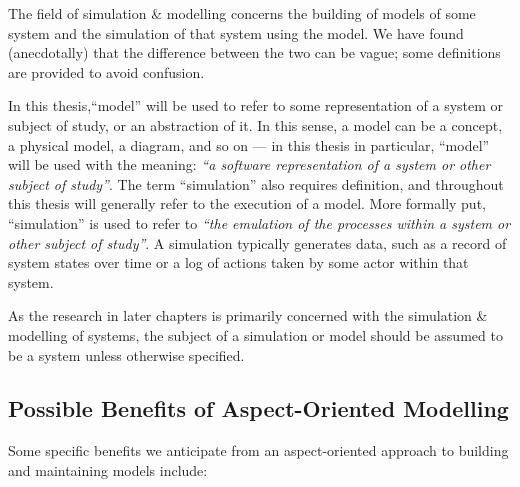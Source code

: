 The field of simulation \& modelling concerns the building of models of some
system and the simulation of that system using the model. We have found
(anecdotally) that the difference between the two can be vague; some definitions
are provided to avoid confusion.

In this thesis,``model'' will be used to refer to some representation of a
system or subject of study, or an abstraction of it. In this sense, a model can
be a concept, a physical model, a diagram, and so on --- in this thesis in
particular, ``model'' will be used with the meaning: \emph{``a software
  representation of a system or other subject of study''}. The term
``simulation'' also requires definition, and throughout this thesis will
generally refer to the execution of a model. More formally put, ``simulation''
is used to refer to \emph{``the emulation of the processes within a system or
  other subject of study''}. A simulation typically generates data, such as a
record of system states over time or a log of actions taken by some actor within
that system.

As the research in later chapters is primarily concerned with the simulation \&
modelling of \sociotechnical systems, the subject of a simulation or model
should be assumed to be a \sociotechnical system unless otherwise specified.


\subsection{Possible Benefits of Aspect-Oriented Modelling}
Some specific benefits we anticipate from an aspect-oriented approach to
building and maintaining models include:



